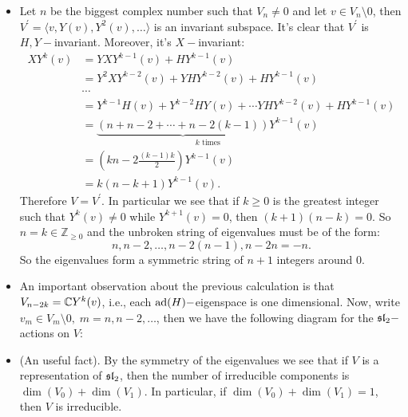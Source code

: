 \begin{itemize}
    \item Let $n$ be the biggest complex number such that $V_{n}\neq0$ and let $v\in V_n\setminus0$, then 
    $V^\prime=\langle v, Y(v), Y^2(v),\dots \rangle$ is an invariant subspace. 
    It's clear that $V^\prime$ is $H,Y-$invariant. Moreover, it's $X-$invariant:
    \begin{equation}
        \begin{split}
            XY^k(v)&=YXY^{k-1}(v)+HY^{k-1}(v)\\
            &=Y^2XY^{k-2}(v)+YHY^{k-2}(v)+HY^{k-1}(v)\\
            &\cdots\\
            &=Y^{k-1}H(v)+Y^{k-2}HY(v)+\cdots YHY^{k-2}(v)+HY^{k-1}(v)\\
            &=\underset{k \text{ times}}{\underbrace{(n+n-2+\cdots+n-2(k-1))}Y^{k-1}(v)}\\
            &=(kn - 2\frac{(k-1)k}{2})Y^{k-1}(v)\\
            &=k(n-k+1)Y^{k-1}(v).
        \end{split}
    \end{equation}
    Therefore $V=V^\prime$. In particular we see that if $k\geq0$ is the greatest integer such that $Y^k(v)\neq0$
    while $Y^{k+1}(v)=0$, then $(k+1)(n-k)=0$. So $n=k\in\mathbb{Z}_{\geq0}$ and the 
    unbroken string of eigenvalues must be of the form:
    \begin{equation}
        n, n-2,\dots, n-2(n-1), n-2n=-n .
    \end{equation}
   So the eigenvalues form a symmetric string of $n+1$ integers around 0.

   \item An important observation about the previous calculation is that $V_{n-2k}=\mathbb{C} Y^k(v)$, i.e., each 
   $\text{ad}(H)-$eigenspace is one dimensional. Now, write $v_m \in V_m\setminus0,\;m=n,n-2,\dots$, then we have
   the following diagram for the $\mathfrak{sl}_2-$actions on $V$:
   \begin{center}
   \end{center} 
   \item (An useful fact). By the symmetry of the eigenvalues we see that if $V$ is a representation of $\mathfrak{sl}_2$, then 
   the number of irreducible components is $\dim(V_0)+\dim(V_1)$. In particular, if $\dim(V_0)+\dim(V_1)=1$, then 
   $V$ is irreducible.


\end{itemize}
